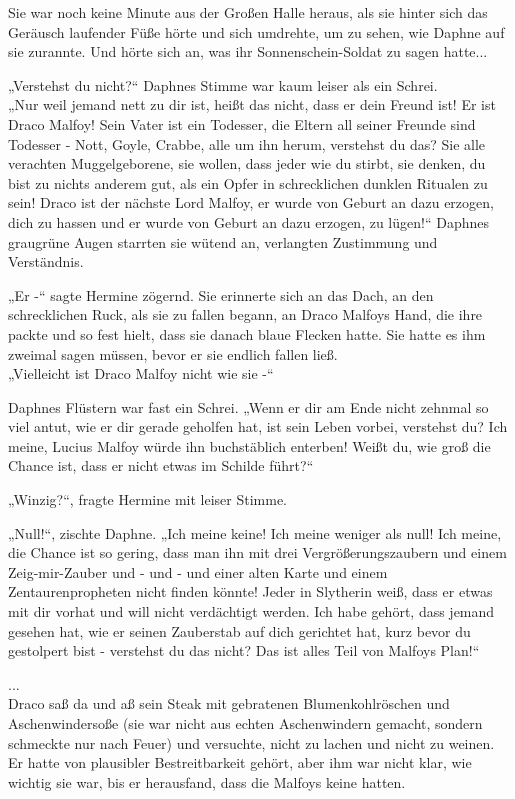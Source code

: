 {Sie war noch keine Minute aus der Großen Halle heraus, als sie hinter sich das Geräusch laufender Füße hörte und sich umdrehte, um zu sehen, wie Daphne auf sie zurannte. Und hörte sich an, was ihr Sonnenschein-Soldat zu sagen hatte...

„Verstehst du nicht?“ Daphnes Stimme war kaum leiser als ein Schrei.\\ „Nur weil jemand nett zu dir ist, heißt das nicht, dass er dein Freund ist! Er ist Draco Malfoy! Sein Vater ist ein Todesser, die Eltern all seiner Freunde sind Todesser - Nott, Goyle, Crabbe, alle um ihn herum, verstehst du das? Sie alle verachten Muggelgeborene, sie wollen, dass jeder wie du stirbt, sie denken, du bist zu nichts anderem gut, als ein Opfer in schrecklichen dunklen Ritualen zu sein! Draco ist der nächste Lord Malfoy, er wurde von Geburt an dazu erzogen, dich zu hassen und er wurde von Geburt an dazu erzogen, zu lügen!“ Daphnes graugrüne Augen starrten sie wütend an, verlangten Zustimmung und Verständnis.

„Er -“ sagte Hermine zögernd. Sie erinnerte sich an das Dach, an den schrecklichen Ruck, als sie zu fallen begann, an Draco Malfoys Hand, die ihre packte und so fest hielt, dass sie danach blaue Flecken hatte. Sie hatte es ihm zweimal sagen müssen, bevor er sie endlich fallen ließ.\\ „Vielleicht ist Draco Malfoy nicht wie sie -“

Daphnes Flüstern war fast ein Schrei. „Wenn er dir am Ende nicht zehnmal so viel antut, wie er dir gerade geholfen hat, ist sein Leben vorbei, verstehst du? Ich meine, Lucius Malfoy würde ihn buchstäblich enterben! Weißt du, wie groß die Chance ist, dass er nicht etwas im Schilde führt?“

„Winzig?“, fragte Hermine mit leiser Stimme.

„Null!“, zischte Daphne. „Ich meine keine! Ich meine weniger als null! Ich meine, die Chance ist so gering, dass man ihn mit drei Vergrößerungszaubern und einem Zeig-mir-Zauber und - und - und einer alten Karte und einem Zentaurenpropheten nicht finden könnte! Jeder in Slytherin weiß, dass er etwas mit dir vorhat und will nicht verdächtigt werden. Ich habe gehört, dass jemand gesehen hat, wie er seinen Zauberstab auf dich gerichtet hat, kurz bevor du gestolpert bist - verstehst du das nicht? Das ist alles Teil von Malfoys Plan!“

...\\ Draco saß da und aß sein Steak mit gebratenen Blumenkohlröschen und Aschenwindersoße (sie war nicht aus echten Aschenwindern gemacht, sondern schmeckte nur nach Feuer) und versuchte, nicht zu lachen und nicht zu weinen. Er hatte von plausibler Bestreitbarkeit gehört, aber ihm war nicht klar, wie wichtig sie war, bis er herausfand, dass die Malfoys keine hatten.

}
